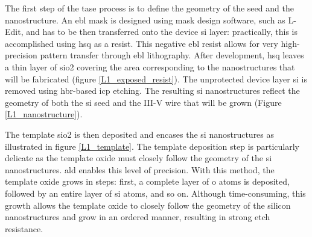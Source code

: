 The first step of the \acs{tase} process is to define the geometry of the seed and the nanostructure. An \acs{ebl} mask is designed using mask design software, such as L-Edit, and has to be then transferred onto the device \acl{si} layer: practically, this is accomplished using \acf{hsq} as a resist. This negative \acs{ebl} resist allows for very high-precision pattern transfer through \acs{ebl} lithography. After development, \acs{hsq} leaves a thin layer of \acl{sio2} covering the area corresponding to the nanostructures that will be fabricated (figure \ref{L1_exposed_resist}). The unprotected device layer \acl{si} is removed using \acf{hbr}-based \acf{icp} etching. The resulting \acl{si} nanostructures reflect the geometry of both the \acl{si} seed and the III-V wire that will be grown (Figure \ref{L1_nanostructure}). 
\par
The template \acl{sio2} is then deposited and encases the \acl{si} nanostructures as illustrated in figure \ref{L1_template}. The template deposition step is particularly delicate as the template oxide must closely follow the geometry of the \acl{si} nanostructures. \Acf{ald} enables this level of precision. With this method, the template oxide grows in steps: first, a complete layer of \acl{o} atoms is deposited, followed by an entire layer of \acl{si} atoms, and so on. Although time-consuming, this growth allows the template oxide to closely follow the geometry of the silicon nanostructures and grow in an ordered manner, resulting in strong etch resistance. 



